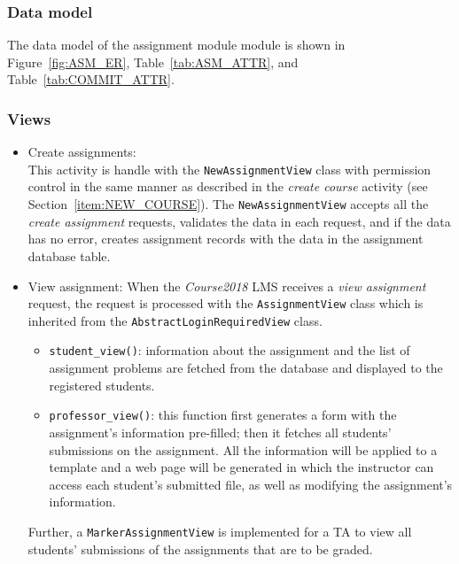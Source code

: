 \subsubsection{Data model}
The data model of the assignment module module is shown in
Figure~\ref{fig:ASM_ER}, Table~\ref{tab:ASM_ATTR},
and Table~\ref{tab:COMMIT_ATTR}. \bigskip


\subsubsection{Views}
\begin{itemize}
    \item Create assignments: \\
        This activity is handle with the \texttt{NewAssignmentView} class with 
        permission control in the same manner as described in the
        \emph{create course} activity (see Section~\ref{item:NEW_COURSE}).
        The \texttt{NewAssignmentView} accepts all the \emph{create assignment}
        requests, validates the data in each request, and if the data has no
        error, creates assignment records with the data in the assignment
        database table.

    \item View assignment:
        When the \emph{Course2018} LMS receives a \emph{view assignment}
        request, the request is processed with the \texttt{AssignmentView}
        class which is inherited from the \texttt{AbstractLoginRequiredView}
        class.
        \begin{itemize}
            \item \texttt{student\_view()}:
                information about the assignment and the list of assignment
                problems are fetched from the database and displayed to the 
                registered students.
            \item \texttt{professor\_view()}:
            \label{item:PROF_VIEW}
                this function first generates a form with the assignment's
                information pre-filled; then it fetches all students'
                submissions on the assignment. All the information will
                be applied to a template and a web page will be generated in
                which the instructor can access each student's submitted file,
                as well as modifying the assignment's information.
        \end{itemize}

        Further, a \texttt{MarkerAssignmentView} is implemented for a TA to
        view all students' submissions of the assignments that are to be
        graded.


\end{itemize}
